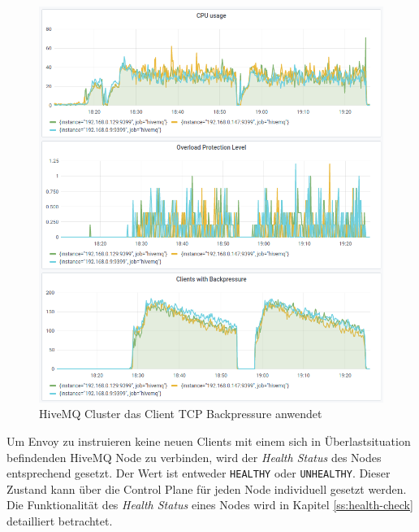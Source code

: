 \begin{figure}
    \centering
    \includegraphics[scale=0.8]{images/overload-protection.png}
    \caption{HiveMQ Cluster das Client TCP Backpressure anwendet}
    \label{fig:overload-protection}
\end{figure}
Um Envoy zu instruieren keine neuen Clients mit einem sich in Überlastsituation befindenden HiveMQ Node zu verbinden, wird der \textit{Health Status} des Nodes entsprechend gesetzt.
Der Wert ist entweder \verb|HEALTHY| oder \verb|UNHEALTHY|. Dieser Zustand kann über die Control Plane für jeden Node individuell gesetzt werden.
\cite{HealthCheckEnvoy}
Die Funktionalität des \textit{Health Status} eines Nodes wird in Kapitel \ref{ss:health-check} detailliert betrachtet.

